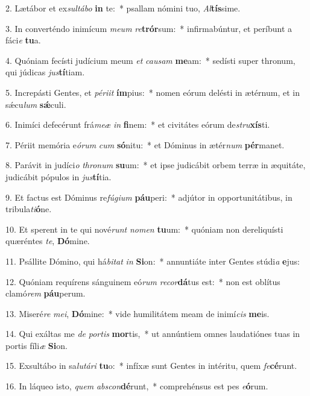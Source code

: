 2. Lætábor et ex\textit{sul}\textit{tá}\textit{bo} \textbf{in} te:~*  psallam nómini tuo, \textit{Al}\textbf{tís}sime.\

3. In converténdo inimícum \textit{me}\textit{um} \textit{re}\textbf{trór}sum:~*  infirmabúntur, et períbunt a fáci\textit{e} \textbf{tu}a.\

4. Quóniam fecísti judícium meum \textit{et} \textit{cau}\textit{sam} \textbf{me}am:~*  sedísti super thronum, qui júdicas \textit{jus}\textbf{tí}tiam.\

5. Increpásti Gentes, et \textit{pér}\textit{i}\textit{it} \textbf{ím}pius:~*  nomen eórum delésti in ætérnum, et in sǽcu\textit{lum} \textbf{sǽ}culi.\

6. Inimíci defecérunt frá\textit{me}\textit{æ} \textit{in} \textbf{fi}nem:~*  et civitátes eórum de\textit{stru}\textbf{xís}ti.\

7. Périit memória e\textit{ó}\textit{rum} \textit{cum} \textbf{só}nitu:~*  et Dóminus in ætér\textit{num} \textbf{pér}manet.\

8. Parávit in judíci\textit{o} \textit{thro}\textit{num} \textbf{su}um:~*  et ipse judicábit orbem terræ in æquitáte, judicábit pópulos in \textit{jus}\textbf{tí}tia.\

9. Et factus est Dóminus re\textit{fú}\textit{gi}\textit{um} \textbf{páu}peri:~*  adjútor in opportunitátibus, in tribula\textit{ti}\textbf{ó}ne.\

10. Et sperent in te qui nové\textit{runt} \textit{no}\textit{men} \textbf{tu}um:~*  quóniam non dereliquísti quæréntes \textit{te}, \textbf{Dó}mine.\

11. Psállite Dómino, qui há\textit{bi}\textit{tat} \textit{in} \textbf{Si}on:~*  annuntiáte inter Gentes stúdi\textit{a} \textbf{e}jus:\

12. Quóniam requírens sánguinem eó\textit{rum} \textit{re}\textit{cor}\textbf{dá}tus est:~*  non est oblítus clamó\textit{rem} \textbf{páu}perum.\

13. Miseré\textit{re} \textit{me}\textit{i}, \textbf{Dó}mine:~*  vide humilitátem meam de inimí\textit{cis} \textbf{me}is.\

14. Qui exáltas me \textit{de} \textit{por}\textit{tis} \textbf{mor}tis,~*  ut annúntiem omnes laudatiónes tuas in portis fíli\textit{æ} \textbf{Si}on.\

15. Exsultábo in sa\textit{lu}\textit{tá}\textit{ri} \textbf{tu}o:~*  infíxæ sunt Gentes in intéritu, quem \textit{fe}\textbf{cé}runt.\

16. In láqueo isto, \textit{quem} \textit{abs}\textit{con}\textbf{dé}runt,~*  comprehénsus est pes \textit{e}\textbf{ó}rum.\

